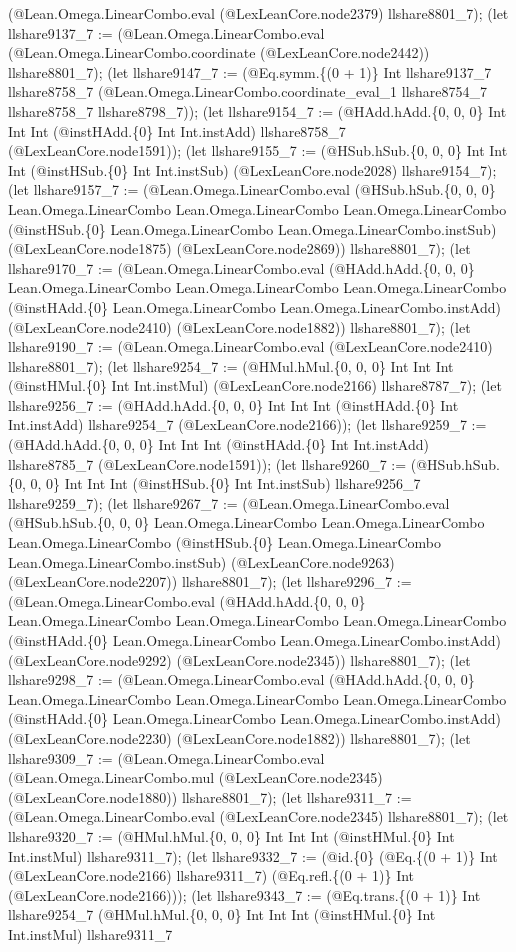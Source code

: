 \documentclass[11pt]{article}
\begin{document}
(@Lean.Omega.LinearCombo.eval (@LexLeanCore.node2379) llshare8801\_7); (let llshare9137\_7 := (@Lean.Omega.LinearCombo.eval (@Lean.Omega.LinearCombo.coordinate (@LexLeanCore.node2442)) llshare8801\_7); (let llshare9147\_7 := (@Eq.symm.\{(0 + 1)\} Int llshare9137\_7 llshare8758\_7 (@Lean.Omega.LinearCombo.coordinate\_eval\_1 llshare8754\_7 llshare8758\_7 llshare8798\_7)); (let llshare9154\_7 := (@HAdd.hAdd.\{0, 0, 0\} Int Int Int (@instHAdd.\{0\} Int Int.instAdd) llshare8758\_7 (@LexLeanCore.node1591)); (let llshare9155\_7 := (@HSub.hSub.\{0, 0, 0\} Int Int Int (@instHSub.\{0\} Int Int.instSub) (@LexLeanCore.node2028) llshare9154\_7); (let llshare9157\_7 := (@Lean.Omega.LinearCombo.eval (@HSub.hSub.\{0, 0, 0\} Lean.Omega.LinearCombo Lean.Omega.LinearCombo Lean.Omega.LinearCombo (@instHSub.\{0\} Lean.Omega.LinearCombo Lean.Omega.LinearCombo.instSub) (@LexLeanCore.node1875) (@LexLeanCore.node2869)) llshare8801\_7); (let llshare9170\_7 := (@Lean.Omega.LinearCombo.eval (@HAdd.hAdd.\{0, 0, 0\} Lean.Omega.LinearCombo Lean.Omega.LinearCombo Lean.Omega.LinearCombo (@instHAdd.\{0\} Lean.Omega.LinearCombo Lean.Omega.LinearCombo.instAdd) (@LexLeanCore.node2410) (@LexLeanCore.node1882)) llshare8801\_7); (let llshare9190\_7 := (@Lean.Omega.LinearCombo.eval (@LexLeanCore.node2410) llshare8801\_7); (let llshare9254\_7 := (@HMul.hMul.\{0, 0, 0\} Int Int Int (@instHMul.\{0\} Int Int.instMul) (@LexLeanCore.node2166) llshare8787\_7); (let llshare9256\_7 := (@HAdd.hAdd.\{0, 0, 0\} Int Int Int (@instHAdd.\{0\} Int Int.instAdd) llshare9254\_7 (@LexLeanCore.node2166)); (let llshare9259\_7 := (@HAdd.hAdd.\{0, 0, 0\} Int Int Int (@instHAdd.\{0\} Int Int.instAdd) llshare8785\_7 (@LexLeanCore.node1591)); (let llshare9260\_7 := (@HSub.hSub.\{0, 0, 0\} Int Int Int (@instHSub.\{0\} Int Int.instSub) llshare9256\_7 llshare9259\_7); (let llshare9267\_7 := (@Lean.Omega.LinearCombo.eval (@HSub.hSub.\{0, 0, 0\} Lean.Omega.LinearCombo Lean.Omega.LinearCombo Lean.Omega.LinearCombo (@instHSub.\{0\} Lean.Omega.LinearCombo Lean.Omega.LinearCombo.instSub) (@LexLeanCore.node9263) (@LexLeanCore.node2207)) llshare8801\_7); (let llshare9296\_7 := (@Lean.Omega.LinearCombo.eval (@HAdd.hAdd.\{0, 0, 0\} Lean.Omega.LinearCombo Lean.Omega.LinearCombo Lean.Omega.LinearCombo (@instHAdd.\{0\} Lean.Omega.LinearCombo Lean.Omega.LinearCombo.instAdd) (@LexLeanCore.node9292) (@LexLeanCore.node2345)) llshare8801\_7); (let llshare9298\_7 := (@Lean.Omega.LinearCombo.eval (@HAdd.hAdd.\{0, 0, 0\} Lean.Omega.LinearCombo Lean.Omega.LinearCombo Lean.Omega.LinearCombo (@instHAdd.\{0\} Lean.Omega.LinearCombo Lean.Omega.LinearCombo.instAdd) (@LexLeanCore.node2230) (@LexLeanCore.node1882)) llshare8801\_7); (let llshare9309\_7 := (@Lean.Omega.LinearCombo.eval (@Lean.Omega.LinearCombo.mul (@LexLeanCore.node2345) (@LexLeanCore.node1880)) llshare8801\_7); (let llshare9311\_7 := (@Lean.Omega.LinearCombo.eval (@LexLeanCore.node2345) llshare8801\_7); (let llshare9320\_7 := (@HMul.hMul.\{0, 0, 0\} Int Int Int (@instHMul.\{0\} Int Int.instMul) llshare9311\_7); (let llshare9332\_7 := (@id.\{0\} (@Eq.\{(0 + 1)\} Int (@LexLeanCore.node2166) llshare9311\_7) (@Eq.refl.\{(0 + 1)\} Int (@LexLeanCore.node2166))); (let llshare9343\_7 := (@Eq.trans.\{(0 + 1)\} Int llshare9254\_7 (@HMul.hMul.\{0, 0, 0\} Int Int Int (@instHMul.\{0\} Int Int.instMul) llshare9311\_7 
\end{document}

